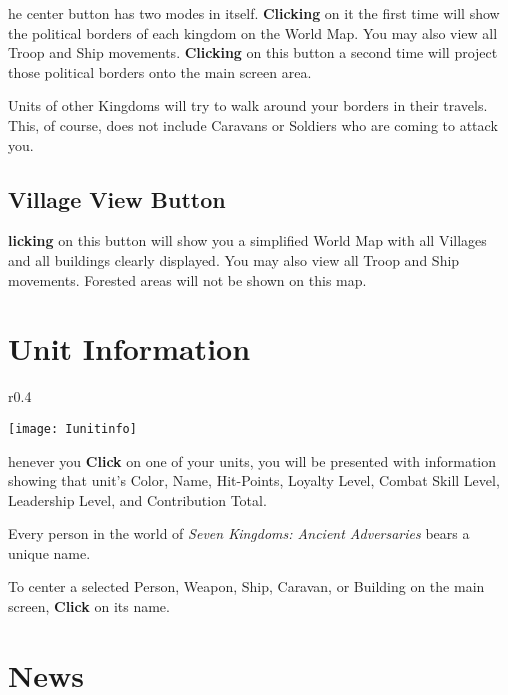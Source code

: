 he center button has two modes in itself. \textbf{Clicking} on it the first time will show the political borders of each kingdom on the World Map. You may also view all Troop and Ship movements. \textbf{Clicking} on this button a second time will project those political borders onto the main screen area.

Units of other Kingdoms will try to walk around your borders in their travels. This, of course, does not include Caravans or Soldiers who are coming to attack you.

\subsection{Village View Button}


\textbf{licking} on this button will show you a simplified World Map with all Villages and all buildings clearly displayed. You may also view all Troop and Ship movements. Forested areas will not be shown on this map.

\section{Unit Information}

\begin{wrapfigure}{r}{0.4\textwidth}
	\vspace{-20pt}
	\begin{center}
		\texttt{[image: Iunitinfo]} %
	\end{center}
	\vspace{-20pt}
\end{wrapfigure}


henever you \textbf{Click} on one of your units, you will be presented with information showing that unit’s Color, Name, Hit-Points, Loyalty Level, Combat Skill Level, Leadership Level, and Contribution Total.

Every person in the world of \textit{Seven Kingdoms: Ancient Adversaries} bears a unique name.


To center a selected Person, Weapon, Ship, Caravan, or Building on the main screen, \textbf{Click} on its name.

\section{News}

